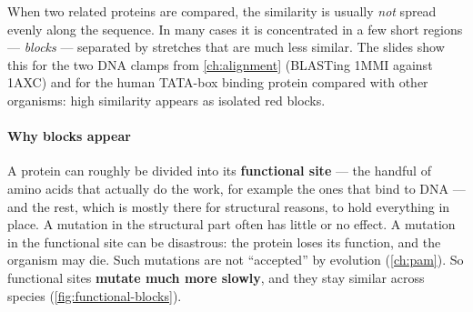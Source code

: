 \documentclass[11pt, oneside]{book}
\begin{document}
When two related proteins are compared, the similarity is usually \emph{not}
spread evenly along the sequence. In many cases it is concentrated in a few
short regions --- \emph{blocks} --- separated by stretches that are much less
similar. The slides show this for the two DNA clamps from \cref{ch:alignment}
(BLASTing 1MMI against 1AXC) and for the human TATA-box binding protein
compared with other organisms: high similarity appears as isolated red blocks.

\paragraph{Why blocks appear}
A protein can roughly be divided into its \textbf{functional site} --- the
handful of amino acids that actually do the work, for example the ones that
bind to DNA --- and the rest, which is mostly there for structural reasons, to
hold everything in place. A mutation in the structural part often has little
or no effect. A mutation in the functional site can be disastrous: the protein
loses its function, and the organism may die. Such mutations are not
``accepted'' by evolution (\cref{ch:pam}). So functional sites
\textbf{mutate much more slowly}, and they stay similar across species
(\cref{fig:functional-blocks}).
\end{document}
